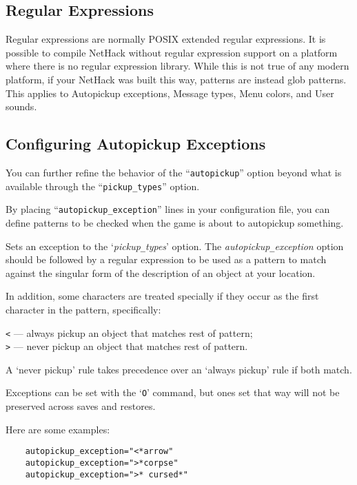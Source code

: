 \subsection*{Regular Expressions}

Regular expressions are normally POSIX extended regular expressions. It is
possible to compile NetHack without regular expression support on a platform where
there is no regular expression library. While this is not true of any modern
platform, if your NetHack was built this way, patterns are instead glob
patterns. This applies to Autopickup exceptions, Message types, Menu colors,
and User sounds.

\subsection*{Configuring Autopickup Exceptions}

You can further refine the behavior of the ``{\tt autopickup}'' option
beyond what is available through the ``{\tt pickup\verb+_+types}'' option.

By placing ``{\tt autopickup\verb+_+exception}'' lines in your configuration
file, you can define patterns to be checked when the game is about to
autopickup something.

\blist{}
\item[\ib{autopickup\verb+_+exception}]
Sets an exception to the `{\it pickup\verb+_+types}' option.
The {\it autopickup\verb+_+exception\/} option should be followed by a regular
expression to be used as a pattern to match against the singular form of the
description of an object at your location.

In addition, some characters are treated specially if they occur as the first 
character in the pattern, specifically:

{\tt <} --- always pickup an object that matches rest of pattern;\\
{\tt >} --- never pickup an object that matches rest of pattern.

A `never pickup' rule takes precedence over an `always pickup' rule if
both match.

Exceptions can be set with the `{\tt O}' command, but ones set that way will
not be preserved across saves and restores.
\elist

Here are some examples:
\begin{verbatim}
    autopickup_exception="<*arrow"
    autopickup_exception=">*corpse"
    autopickup_exception=">* cursed*"
\end{verbatim}

